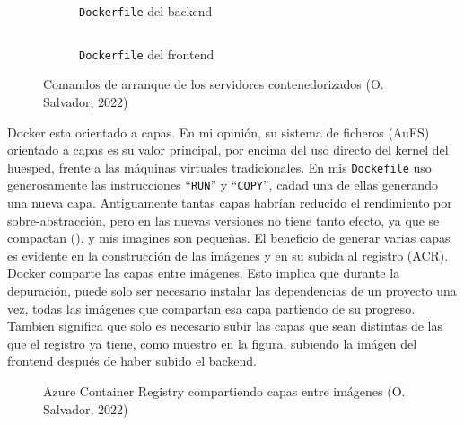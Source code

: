 \documentclass[11pt]{article}
\begin{document}
\begin{flushleft}
		\begin{figure}[htb]
			\centering
			\begin{subfigure}{0.3\textwidth}
				\inputminted[fontsize=\scriptsize, firstline=21, lastline=22, linenos, frame=single, breaklines]{dockerfile}{../../backend/Dockerfile}
			\caption{\texttt{Dockerfile} del backend}
			\end{subfigure}
			\hspace{1.5cm}
			\begin{subfigure}{0.5\textwidth}
				\inputminted[fontsize=\scriptsize, firstline=36, lastline=37, linenos, frame=single, breaklines]{dockerfile}{../../frontend/Dockerfile}
			\caption{\texttt{Dockerfile} del frontend}
			\end{subfigure}

			\caption{Comandos de arranque de los servidores contenedorizados (O. Salvador, 2022)}
		\end{figure}

	\clearpage
	Docker esta orientado a capas. En mi opinión, su sistema de ficheros (AuFS) orientado a capas es su valor principal, por encima del uso directo del kernel del huesped, frente a las máquinas virtuales tradicionales. En mis \texttt{Dockefile} uso generosamente las instrucciones ``\texttt{RUN}'' y ``\texttt{COPY}'', cadad una de ellas generando una nueva capa. Antiguamente tantas capas habrían reducido el rendimiento por sobre-abstracción, pero en las nuevas versiones no tiene tanto efecto, ya que se compactan (\cite{docker_layers}), y mis imagines son pequeñas. El beneficio de generar varias capas es evidente en la construcción de las imágenes y en su subida al registro (ACR). Docker comparte las capas entre imágenes. Esto implica que durante la depuración, puede solo ser necesario instalar las dependencias de un proyecto una vez, todas las imágenes que compartan esa capa partiendo de su progreso. Tambien significa que solo es necesario subir las capas que sean distintas de las que el registro ya tiene, como muestro en la figura, subiendo la imágen del frontend después de haber subido el backend.
	\linebreak
	
	\begin{figure}[htb]
		\centering
		\caption{Azure Container Registry compartiendo capas entre imágenes (O. Salvador, 2022)}
	\end{figure}
	

\end{flushleft}
\end{document}

